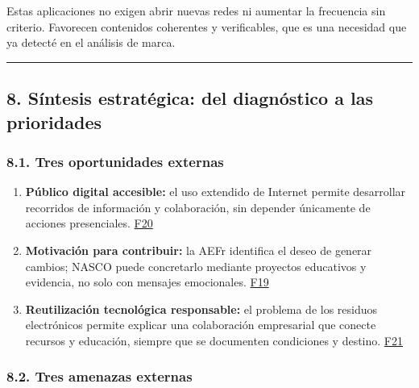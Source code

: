 \documentclass[
]{article}
\providecommand{\tightlist}{%
  \setlength{\itemsep}{0pt}\setlength{\parskip}{0pt}}
\begin{document}
Estas aplicaciones no exigen abrir nuevas redes ni aumentar la
frecuencia sin criterio. Favorecen contenidos coherentes y verificables,
que es una necesidad que ya detecté en el análisis de marca.

\begin{center}\rule{0.5\linewidth}{0.5pt}\end{center}

\hypertarget{suxedntesis-estratuxe9gica-del-diagnuxf3stico-a-las-prioridades}{%
\subsection{8. Síntesis estratégica: del diagnóstico a las
prioridades}\label{suxedntesis-estratuxe9gica-del-diagnuxf3stico-a-las-prioridades}}

\hypertarget{tres-oportunidades-externas}{%
\subsubsection{8.1. Tres oportunidades
externas}\label{tres-oportunidades-externas}}

\begin{enumerate}
\def\labelenumi{\arabic{enumi}.}
\tightlist
\item
  \textbf{Público digital accesible:} el uso extendido de Internet
  permite desarrollar recorridos de información y colaboración, sin
  depender únicamente de acciones presenciales.
  \href{https://www.ine.es/dyngs/Prensa/es/TICH2025.htm}{F20}
\item
  \textbf{Motivación para contribuir:} la AEFr identifica el deseo de
  generar cambios; NASCO puede concretarlo mediante proyectos educativos
  y evidencia, no solo con mensajes emocionales.
  \href{https://www.aefundraising.org/perfil-donante-2024-que-impulsa-a-los-espanoles-a-colaborar/}{F19}
\item
  \textbf{Reutilización tecnológica responsable:} el problema de los
  residuos electrónicos permite explicar una colaboración empresarial
  que conecte recursos y educación, siempre que se documenten
  condiciones y destino.
  \href{https://www.itu.int/en/ITU-D/Environment/Pages/Publications/The-Global-E-waste-Monitor-2024.aspx}{F21}
\end{enumerate}

\hypertarget{tres-amenazas-externas}{%
\subsubsection{8.2. Tres amenazas
externas}\label{tres-amenazas-externas}}
\end{document}
